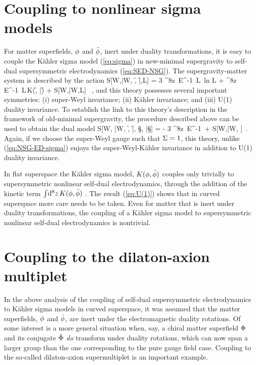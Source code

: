 \vskip0.5cm
\section{Coupling to nonlinear sigma models}
\noindent For matter superfields, $\f$ and ${\bar \f}$, inert under duality transformations, it is easy to couple the K{\"a}hler sigma model (\ref{eq:sigma}) in new-minimal supergravity to self-dual supersymmetric electrodynamics (\ref{eq:SED-NSG}). The supergravity-matter system is described by the action
\be
\label{eq:NSG-ED-sigma}
S[W,{\bar W}, \f, {\bar \f},{\mathbb L}]
= 3 {\int\!^8z}\, E^{-1}\,
{\mathbb L}\, {\rm ln} {\mathbb L} + {\int\!^8z}\, E^{-1}\,
{\mathbb L}\,K(\f, \bar \f )
+ S[W,{\bar W},{\mathbb L}] ~,
\ee
and this theory possesses several important symmetries: (i) super-Weyl invariance; (ii) K{\"a}hler invariance; and (iii) U(1) duality invariance. To establish the link to this theory's description in the framework of old-minimal supergravity, the procedure described above can be used to obtain the dual model
\be
\label{eq:U(1)}
S[W, {\bar W}, \f, {\bar \f}, \S, \bar \S] =
- 3 {\int\!^8z}\, E^{-1}\,  \tilde{\U}
+ S[W,{\bar W}, \tilde{\U}]~.
\ee
Again, if we choose the super-Weyl gauge such that $\S=1$, this theory, unlike (\ref{eq:NSG-ED-sigma}) enjoys the super-Weyl-K{\"a}hler invariance in addition to U(1) duality invariance.

In flat superspace the K{\"a}hler sigma model, $K(\f, \bar \f )$ couples only trivially to supersymmetric nonlinear self-dual electrodynamics, through the addition of the kinetic term ${\int\!{\rm d}^8z}\,K(\f, \bar \f )$ \cite{Kuzenko:2000uh}. The result (\ref{eq:U(1)}) shows that in curved superspace more care needs to be taken. Even for matter that is inert under duality transformations, the coupling of a K{\"a}hler sigma model to supersymmetric nonlinear self-dual electrodynamics is nontrivial.


\vskip0.5cm
\section{Coupling to the dilaton-axion multiplet}\label{sec:dil-ax}
\noindent In the above analysis of the coupling of self-dual supersymmetric electrodynamics to K\"ahler sigma models in curved superspace, it was assumed that the matter superfields, $\f$ and $\bar \f$, are inert under the electromagnetic duality rotations. Of some interest is a more general situation when, say,  a chiral matter superfield $\F$ and its conjugate $\bar \F$ {\it do} transform under duality rotations, which can now span a larger group than the one corresponding to the pure gauge field case. Coupling to the so-called dilaton-axion supermultiplet is an important example.

